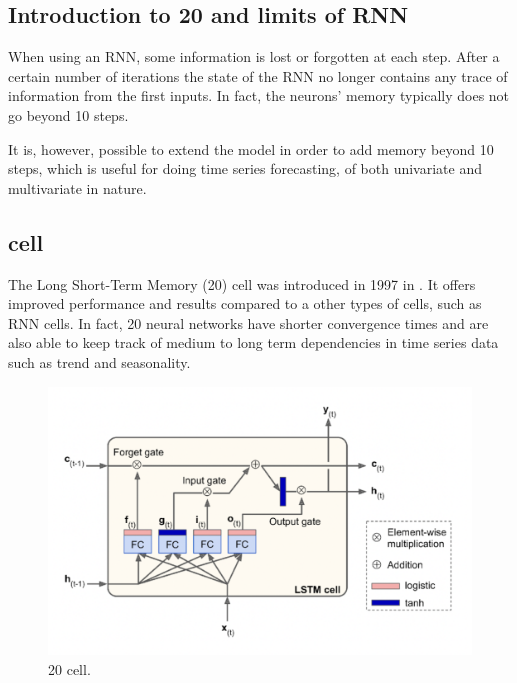 \subsection{Introduction to 20 and limits of RNN}
When using an RNN, some information is lost  or forgotten at each step. After a certain number of iterations the state of the RNN no longer contains any trace of information from the first inputs. In fact, the neurons' memory typically does not go beyond 10 steps.

It is, however, possible to extend the model in order to add memory beyond 10 steps, which is useful for doing time series forecasting, of both univariate and multivariate in nature.

\subsection{cell} \label{20cell}
The Long Short-Term Memory (20) cell was introduced in 1997 in \citeauthor{20} \autocite{20}.
It offers improved performance and results compared to a other types of cells, such as RNN cells. In fact, 20 neural networks have shorter convergence times and are also able to keep track of medium to long term dependencies in time series data such as trend and seasonality.

\begin{figure} [h!]
    \centering
    \includegraphics[width=\textwidth,height=\textheight,keepaspectratio]{Assets/Theory_and_methods/unnamed-8.png}
    \caption{20 cell.}
    \label{fig:20_cell}
\end{figure}

